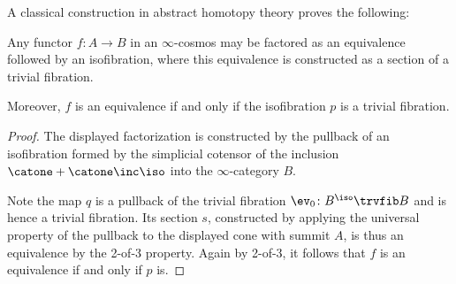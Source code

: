A classical construction in abstract homotopy theory proves the following:

\begin{lemma}\label{lem:brown-fact}
  Any functor $f\colon A \to B$ in an $\infty$-cosmos may be factored as an equivalence followed by an isofibration, where this equivalence is constructed as a section of a trivial fibration.
\begin{center}
\end{center}
Moreover, $f$ is an equivalence if and only if the isofibration $p$ is a trivial fibration.
\end{lemma}


\begin{proof}
The displayed factorization is constructed by the pullback of an isofibration formed by the simplicial cotensor of the inclusion $\catone+\catone\inc\iso$ into the $\infty$-category $B$.
\begin{center}
\end{center}
Note the map $q$ is a pullback of the trivial fibration $\ev_0 \colon B^\iso \trvfib B$ and is hence a trivial fibration. Its section $s$, constructed by applying the universal property of the pullback to the displayed cone with summit $A$, is thus an equivalence by the 2-of-3 property. Again by 2-of-3, it follows that $f$ is an equivalence if and only if $p$ is.
\end{proof}


